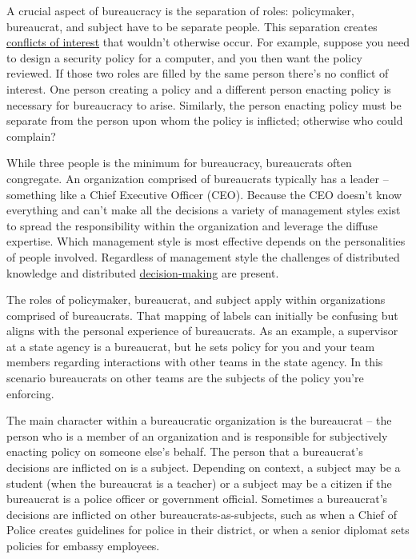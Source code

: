 A crucial aspect of bureaucracy is the separation of roles: policymaker, bureaucrat, and subject have to be separate people. This separation creates 
\href{https://en.wikipedia.org/wiki/Conflict_of_interest}{conflicts of interest}  
that wouldn't otherwise occur. For example, suppose you need to design a security policy for a computer, and you then want the policy reviewed. If those two roles are filled by the same person there's no conflict of interest. 
One person creating a policy and a different person enacting policy is necessary for bureaucracy to arise. Similarly, the person enacting policy must be separate from the person upon whom the policy is inflicted; otherwise who could complain?

While three people is the minimum for bureaucracy, bureaucrats often congregate. 
An organization comprised of bureaucrats typically has a leader -- something like a Chief Executive Officer (CEO). Because the CEO doesn't know everything and can't make all the decisions a variety of management styles exist to spread the responsibility within the organization and leverage the diffuse expertise. Which management style is most effective depends on the personalities of people involved. Regardless of management style the challenges of distributed knowledge and distributed 
\href{https://en.wikipedia.org/wiki/Decision-making}{decision-making} 
are present. 

The roles of policymaker, bureaucrat, and subject apply within organizations comprised of bureaucrats. That mapping of labels can initially be confusing but aligns with the personal experience of bureaucrats. As an example, a supervisor at a state agency is a bureaucrat, but he sets policy for you and your team members regarding interactions with other teams in the state agency. In this scenario bureaucrats on other teams are the subjects of the policy you're enforcing.

The main character within a bureaucratic organization is the \gls{bureaucrat} -- the person who is a member of an organization and is responsible for subjectively enacting policy on someone else's behalf. The person that a bureaucrat's decisions are inflicted on is a \gls{subject}.  Depending on context, a subject may be a student (when the bureaucrat is a teacher)
or a subject may be a citizen if the bureaucrat is a police officer 
or government official. Sometimes a bureaucrat's decisions are inflicted on other bureaucrats-as-subjects, such as when a Chief of Police creates guidelines for police in their district, or when a senior diplomat sets policies for embassy employees. 

